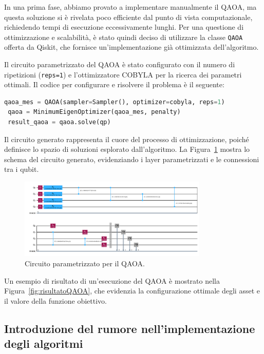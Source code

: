 In una prima fase, abbiamo provato a implementare manualmente il QAOA, ma questa 
soluzione si è rivelata poco efficiente dal punto di vista computazionale, richiedendo 
tempi di esecuzione eccessivamente lunghi. Per una questione di ottimizzazione e 
scalabilità, è stato quindi deciso di utilizzare la classe \texttt{QAOA} offerta da 
Qiskit, che fornisce un'implementazione già ottimizzata dell'algoritmo.

Il circuito parametrizzato del QAOA è stato configurato con il numero di ripetizioni 
(\texttt{reps=1}) e l'ottimizzatore COBYLA per la ricerca dei parametri ottimali. 
Il codice per configurare e risolvere il problema è il seguente:

\begin{lstlisting}[language=python, caption={\mmerenda{todo}}]
 qaoa_mes = QAOA(sampler=Sampler(), optimizer=cobyla, reps=1)
 qaoa = MinimumEigenOptimizer(qaoa_mes, penalty)
 result_qaoa = qaoa.solve(qp)
\end{lstlisting}

Il circuito generato rappresenta il cuore del processo di ottimizzazione, poiché 
definisce lo spazio di soluzioni esplorato dall'algoritmo. 
La Figura~\ref{fig:qaoa_circuit} mostra lo schema del circuito generato, evidenziando 
i layer parametrizzati e le connessioni tra i qubit.

\begin{figure}[h!]
    \centering
    \includegraphics[width=0.8\textwidth]{images/circuitoQAOA.png}
    \caption{Circuito parametrizzato per il QAOA.}
    \label{fig:qaoa_circuit}
\end{figure}

Un esempio di risultato di un'esecuzione del QAOA è mostrato nella 
Figura~\ref{fig:risultatoQAOA}, che evidenzia la configurazione ottimale degli asset 
e il valore della funzione obiettivo.



\subsection{Introduzione del rumore nell'implementazione degli algoritmi}


